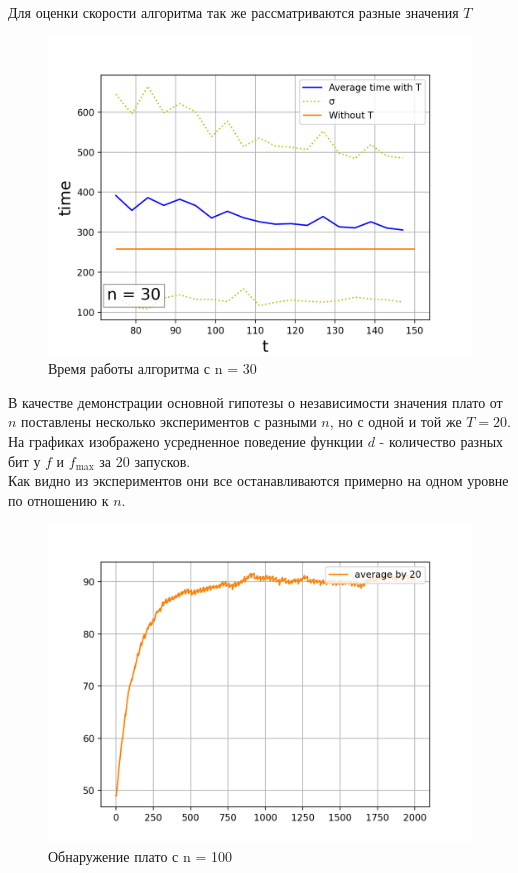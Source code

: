 \documentclass[times,specification,annotation]{itmo-student-thesis}
\begin{document}
    Для оценки скорости алгоритма так же рассматриваются разные значения $T$
    \begin{figure}[H]
        \centering
        \caption{Время работы алгоритма с n = 30}
        \label{pic:sublists-metafile}
        \includegraphics[scale=0.8]{plot_time_30_as_30.png}
    \end{figure}


    В качестве демонстрации основной гипотезы о независимости значения плато от $n$ поставлены несколько экспериментов с разными $n$, но с одной и той же $T = 20$. \\
    На графиках изображено усредненное поведение функции $d$ - количество разных бит у $f$ и $f_{\max}$ за 20 запусков. \\
    Как видно из экспериментов они все останавливаются примерно на одном уровне по отношению к $n$. \\
    \begin{figure}[H]
        \centering
        \caption{Обнаружение плато с n = 100}
        \label{pic:sublists-metafile}
        \includegraphics[scale=0.8]{plot_d_averaged_100_1_20_2000.png}
    \end{figure}
\end{document}
